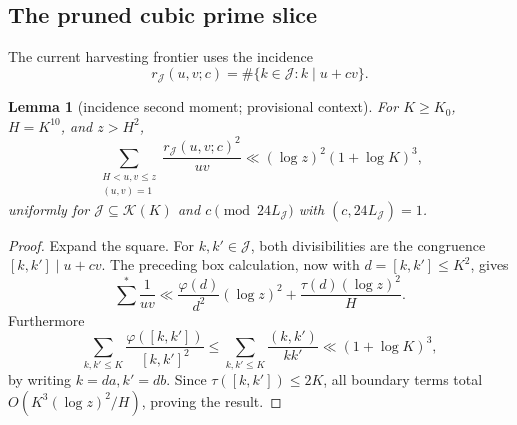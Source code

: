 \documentclass[10pt,reqno]{amsart}
\newtheorem{lemma}[theorem]{Lemma}
\theoremstyle{definition}
\newcommand{\1}{\mathbf 1}
\begin{document}
\subsection{The pruned cubic prime slice}
The current harvesting frontier uses the incidence
\[
 r_\mathcal J(u,v;c)=\#\{k\in\mathcal J:k\mid u+cv\}.
\]
\begin{lemma}[incidence second moment; provisional context]\label{lem:incidence}
For $K\geq K_0$, $H=K^{10}$, and $z>H^2$,
\[
 \sum_{\substack{H<u,v\leq z\\(u,v)=1}}
 \frac{r_\mathcal J(u,v;c)^2}{uv}
 \ll(\log z)^2(1+\log K)^3,
\]
uniformly for $\mathcal J\subseteq\mathcal K(K)$ and
$c\pmod{24L_\mathcal J}$ with $(c,24L_\mathcal J)=1$.
\end{lemma}
\begin{proof}
Expand the square.  For $k,k'\in\mathcal J$, both divisibilities are the congruence $[k,k']\mid u+cv$.  The preceding box calculation, now with $d=[k,k']\leq K^2$, gives
\[
 \sum^*\frac1{uv}\ll\frac{\varphi(d)}{d^2}(\log z)^2
       +\frac{\tau(d)(\log z)^2}{H}.
\]
Furthermore
\[
 \sum_{k,k'\leq K}\frac{\varphi([k,k'])}{[k,k']^2}
 \leq\sum_{k,k'\leq K}\frac{(k,k')}{kk'}
 \ll(1+\log K)^3,
\]
by writing $k=da,k'=db$.  Since $\tau([k,k'])\leq2K$, all boundary terms total $O(K^3(\log z)^2/H)$, proving the result.
\end{proof}
\end{document}
